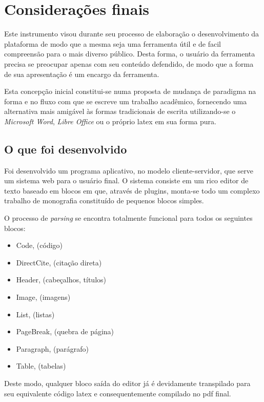 \chapter{Considerações finais}

Este instrumento visou durante seu processo de
elaboração o desenvolvimento da plataforma de modo
que a mesma seja uma ferramenta útil e de
facil compreensão para o mais diverso público.
Desta forma, o usuário da ferramenta precisa se preocupar
apenas com seu conteúdo defendido, de modo que a forma de
sua apresentação é um encargo da ferramenta.

Esta concepção inicial constitui-se numa proposta de mudança 
de paradigma na forma e no fluxo com que se escreve um trabalho
acadêmico, fornecendo uma alternativa mais amigável às formas
tradicionais de escrita utilizando-se o \textit{Microsoft Word},
\textit{Libre Office} ou o próprio
\acrshort{latex}
em sua forma pura.

\section{O que foi desenvolvido}

Foi desenvolvido um programa aplicativo, no modelo cliente-servidor,
que serve um sistema
\acrshort{web}
para o usuário final. O sistema consiste em um rico editor de texto
baseado em blocos em que, através de plugins, monta-se todo um complexo
trabalho de monografia constituído de pequenos blocos simples.

O processo de \textit{parsing} se encontra totalmente funcional para todos os seguintes blocos:

\begin{itemize}
        
	\item Code, (código)
	\item DirectCite, (citação direta)
	\item Header, (cabeçalhos, títulos)
	\item Image, (imagens)
	\item List, (listas)
	\item PageBreak, (quebra de página)
	\item Paragraph, (parágrafo)
	\item Table, (tabelas)
    
\end{itemize}

Deste modo, qualquer bloco saída do editor já é devidamente transpilado para seu equivalente
código
\acrshort{latex}
e consequentemente compilado no
\acrshort{pdf} final.


